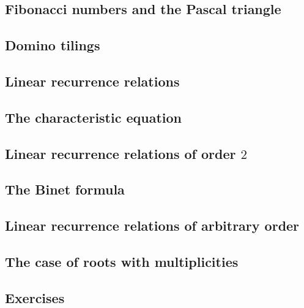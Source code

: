 \subsection{Fibonacci numbers and the Pascal triangle}

\subsection{Domino tilings}

\subsection{Linear recurrence relations}

\subsection{The characteristic equation}

\subsection{Linear recurrence relations of order $2$}

\subsection{The Binet formula}

\subsection{Linear recurrence relations of arbitrary order}

\subsection{The case of roots with multiplicities}

\subsection{Exercises}

